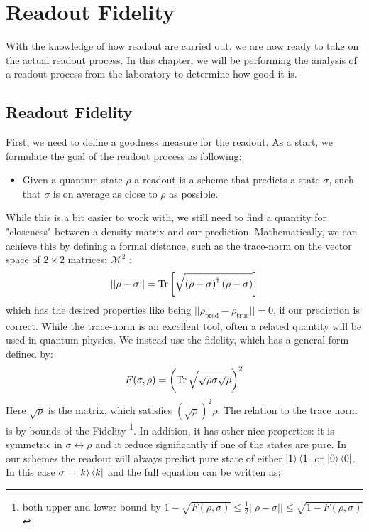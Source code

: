 \chapter{Readout Fidelity}\label{chap:readout}
With the knowledge of how readout are carried out, we are now ready to take on the actual readout process. In this chapter, we will be performing the analysis of a readout process from the laboratory to determine how good it is.

\section{Readout Fidelity}
First, we need to define a goodness measure for the readout. As a start, we formulate the goal of the readout process as following:
\begin{itemize}
    \item Given a quantum state $\rho$ a readout is a scheme that predicts a state $\sigma$, such that $\sigma$ is on average as close to $\rho$ as possible.
\end{itemize}
While this is a bit easier to work with, we still need to find a quantity for "closeness" between a density matrix and our prediction. Mathematically, we can achieve this by defining a formal distance, such as the trace-norm on the vector space of $2\times2$ matrices: $\mathcal{M}^2$ \cite{wilde}:
\begin{equation}
    ||\rho - \sigma|| = \Tr \left[\sqrt{\left(\rho - \sigma \right)^\dagger \left(\rho - \sigma \right)} \right]
\end{equation}
which has the desired properties like being $||\rho_{\text{pred}} - \rho_{\text{true}}|| = 0$, if our prediction is correct. While the trace-norm is an excellent tool, often a related quantity will be used in quantum physics.  We instead use the fidelity, which has a general form defined by:
\begin{equation}
    F(\sigma, \rho) = \left(\Tr\sqrt{\sqrt{\rho} \sigma \sqrt{\rho}}\right)^2
\end{equation}
Here $\sqrt{\rho}$ is the matrix, which satisfies $(\sqrt{\rho})^2 \rho$. The relation to the trace norm is by bounds of the Fidelity \footnote{both upper and lower bound by $1 - \sqrt{F(\rho, \sigma)} \leq \frac{1}{2} ||\rho - \sigma|| \leq \sqrt{1 - F(\rho, \sigma)}$ \cite{wilde}}.  In addition, it has other nice properties: it is symmetric in $\sigma \leftrightarrow \rho$ and it reduce significantly if one of the states are pure. In our schemes the readout will always predict pure state of either $\ket{1}\bra{1}$ or $\ket{0}\bra{0}$. In this case $\sigma = \ket{k}\bra{k}$ and the full equation can be written as:
